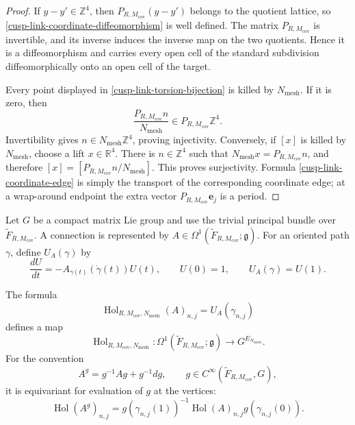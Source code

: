 \begin{proof}
If \(y-y'\in\mathbb Z^4\), then
\(P_{R,M_{\mathrm{cov}}}(y-y')\) belongs to the quotient lattice, so
\eqref{cusp-link-coordinate-diffeomorphism} is well defined.  The matrix
\(P_{R,M_{\mathrm{cov}}}\) is invertible, and its inverse induces the
inverse map on the two quotients.  Hence it is a diffeomorphism and carries
every open cell of the standard subdivision diffeomorphically onto an open
cell of the target.

Every point displayed in \eqref{cusp-link-torsion-bijection} is killed by
\(N_{\mathrm{mesh}}\).  If it is zero, then
\[
 \frac{P_{R,M_{\mathrm{cov}}}n}{N_{\mathrm{mesh}}}
 \in P_{R,M_{\mathrm{cov}}}\mathbb Z^4.
\]
Invertibility gives
\(n\in N_{\mathrm{mesh}}\mathbb Z^4\), proving injectivity.  Conversely,
if \([x]\) is killed by \(N_{\mathrm{mesh}}\), choose a lift
\(x\in\mathbb R^4\).  There is \(n\in\mathbb Z^4\) such that
\(N_{\mathrm{mesh}}x=P_{R,M_{\mathrm{cov}}}n\), and therefore
\([x]=[P_{R,M_{\mathrm{cov}}}n/N_{\mathrm{mesh}}]\).  This proves
surjectivity.  Formula \eqref{cusp-link-coordinate-edge} is simply the
transport of the corresponding coordinate edge; at a wrap-around endpoint
the extra vector \(P_{R,M_{\mathrm{cov}}}\mathbf e_j\) is a period.
\end{proof}

Let \(G\) be a compact matrix Lie group and use the trivial principal bundle over
\(\widetilde F_{R,M_{\mathrm{cov}}}\).  A connection is represented by
\(A\in\Omega^1(\widetilde F_{R,M_{\mathrm{cov}}};\mathfrak g)\).  For an
oriented path \(\gamma\), define \(U_A(\gamma)\) by
\begin{equation}
 \frac{dU}{dt}=-A_{\gamma(t)}(\dot\gamma(t))U(t),
 \qquad U(0)=1,
 \qquad U_A(\gamma)=U(1).
 \label{cusp-link-parallel-transport-ode}
\end{equation}

\begin{proposition}
\label{cusp-link-holonomy-map}
The formula
\begin{equation}
 \operatorname{Hol}_{R,M_{\mathrm{cov}},N_{\mathrm{mesh}}}(A)_{n,j}
 =U_A(\gamma_{n,j})
 \label{cusp-link-holonomy-definition}
\end{equation}
defines a map
\begin{equation}
 \operatorname{Hol}_{R,M_{\mathrm{cov}},N_{\mathrm{mesh}}}:
 \Omega^1(\widetilde F_{R,M_{\mathrm{cov}}};\mathfrak g)
 \longrightarrow G^{E_{N_{\mathrm{mesh}}}}.
 \label{cusp-link-holonomy-typed}
\end{equation}
For the convention
\begin{equation}
 A^g=g^{-1}Ag+g^{-1}dg,
 \qquad
 g\in C^\infty(\widetilde F_{R,M_{\mathrm{cov}}},G),
 \label{cusp-link-gauge-convention}
\end{equation}
it is equivariant for evaluation of \(g\) at the vertices:
\begin{equation}
 \operatorname{Hol}(A^g)_{n,j}
 =g(\gamma_{n,j}(1))^{-1}
  \operatorname{Hol}(A)_{n,j}
  g(\gamma_{n,j}(0)).
 \label{cusp-link-holonomy-equivariance}
\end{equation}
\end{proposition}

